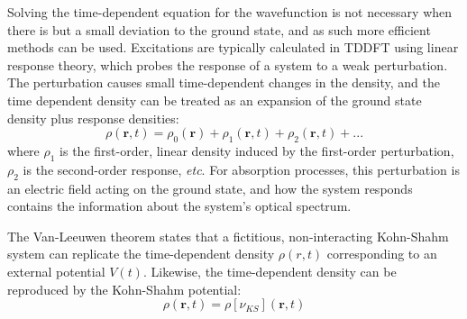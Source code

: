 Solving the time-dependent \schro{} equation for the wavefunction is not necessary when there is but a small deviation to the ground state, and as such more efficient methods can be used. Excitations are typically calculated in \ac{TDDFT} using linear response theory, which probes the response of a system to a weak perturbation. The perturbation causes small time-dependent changes in the density, and the time dependent density can be treated as an expansion of the ground state density plus response densities:
\begin{equation}
    \rho(\bm{r},t)=\rho_{0}(\bm{r})+\rho_{1}(\bm{r},t)+\rho_{2}(\bm{r},t)+...
\end{equation}
where $\rho_1$ is the first-order, linear density induced by the first-order perturbation, $\rho_2$ is the second-order response, \textit{etc}. For absorption processes, this perturbation is an electric field acting on the ground state, and how the system responds contains the information about the system's optical spectrum.\cite{Ullrich2012}

The Van-Leeuwen theorem states that a fictitious, non-interacting Kohn-Shahm system can replicate the time-dependent density $\rho(r,t)$ corresponding to an external potential $V(t)$.\cite{Leeuwen1999} Likewise, the time-dependent density can be reproduced by the Kohn-Shahm potential:
\begin{equation}
    \rho(\bm{r},t)=\rho[\nu_{KS}](\bm{r},t)
\end{equation}

